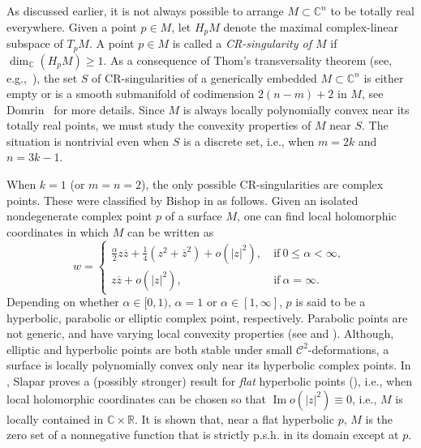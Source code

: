 \documentclass[10pt]{amsart}
\numberwithin{equation}{section}
\theoremstyle{definition}
\theoremstyle{definition}
\theoremstyle{plain}
\newcommand{\bes} {\begin{equation*}}
\newcommand{\ees} {\end{equation*}}
\newcommand{\zbar}{\overline{z}}
\newcommand{\cont}{\mathcal{C}}
\newcommand{\ima}{\operatorname{Im}}
\newcommand{\Cn}{\mathbb{C}^n}
\newcommand{\C} {\mathbb{C}}
\newcommand{\rl}{\mathbb{R}}
\begin{document}
As discussed earlier, it is not always possible to arrange $M\subset \Cn$ to be totally real everywhere. Given a point $p\in M$, let $H_pM$ denote the maximal complex-linear subspace of $T_pM$. A point $p\in M$ is called a {\em CR-singularity of $M$} if $\dim_\C(H_pM)\geq 1$. As a consequence of Thom's transversality theorem (see, e.g.,~\cite{GoGu73}), the set $S$ of CR-singularities of a generically embedded $M\subset\Cn$ is either empty or is a smooth submanifold of codimension $2(n-m)+2$ in $M$, see Domrin~\cite{Do95} for more details. 
Since $M$ is always locally polynomially convex near its totally real points, we must study the convexity properties of $M$ near $S$. The situation is nontrivial even when $S$ is a discrete set, i.e., when $m=2k$ and $n=3k-1$.      

When $k=1$ (or $m=n=2$), the only possible CR-singularities are complex points. These were classified by Bishop in \cite{Bi65} as follows. Given an isolated nondegenerate complex point $p$ of a surface $M$, one can find local holomorphic coordinates in which $M$ can be written as
	\bes
		w=\begin{cases}
				\frac{\alpha}{2} z\zbar+\frac{1}{4}(z^2+\zbar^2)+o(|z|^2),& \ \text{if}\ 0\leq \alpha<\infty,\, \\
				z\zbar+o(|z|^2),&\ \text{if}\ \alpha=\infty.
			\end{cases}
	\ees
Depending on whether $\alpha\in[0,1)$, $\alpha=1$ or $\alpha\in[1,\infty]$, $p$ is said to be a hyperbolic, parabolic or elliptic complex point, respectively. Parabolic points are not generic, and have varying local convexity properties (see \cite{Wi95} and \cite{Jo97}). Although, elliptic and hyperbolic points are both stable under small $\cont^2$-deformations, a surface is locally polynomially convex only near its hyperbolic complex points. In \cite{Sl04}, Slapar proves a (possibly stronger) result for {\em flat} hyperbolic points (\cite{FoSt91}), i.e., when local holomorphic coordinates can be chosen so that $\ima o(|z|^2)\equiv 0$, i.e., $M$ is locally contained in $\C\times\rl$. It is shown that, near a flat hyperbolic $p$, $M$ is the zero set of a nonnegative function that is strictly p.s.h. in its domain except at $p$. 
 
\end{document}
